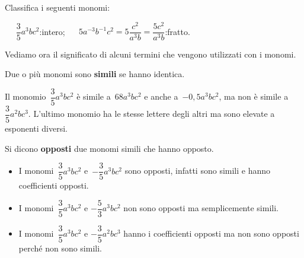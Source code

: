 
\begin{esempio}{}{}
Classifica i seguenti monomi:

\hfill {}~~ \(\dfrac{3}{5}a^{3}bc^{2}\):\quad intero; 
\hfill
{}~~ \(5a^{-3}b^{-1}c^{2}=
             5 \dfrac{c^{2}}{a^{3}b} =
             \dfrac{5c^{2}}{a^{3}b}\):\quad fratto. \hfill~
\end{esempio}

Vediamo ora il significato di alcuni termini che vengono utilizzati con i 
monomi.

\begin{definizione}{}{}
Due o più monomi sono \textbf{simili} se
hanno  identica.
\end{definizione}

\begin{esempio}{}{}
Il monomio~\(\dfrac{3}{5}a^{3}bc^{2}\) è simile
a~\(68a^{3}bc^{2}\) e anche a~\(-0,5a^{3}bc^{2}\), ma non è simile
a~\(\dfrac{3}{5}a^{2}bc^{3}\). 
L'ultimo monomio ha le stesse lettere degli altri ma sono elevate a 
esponenti diversi.
\end{esempio}

\begin{definizione}{}{}
Si dicono \textbf{opposti} due monomi
simili che hanno  opposto.
\end{definizione}

\begin{esempio}{}{}
\begin{itemize} [nosep]
\item
I monomi~\(\dfrac{3}{5}a^{3}bc^{2}\) e~\(-{\dfrac{3}{5}}a^{3}bc^{2}\) 
sono opposti, infatti sono simili e hanno coefficienti opposti.
\item
I monomi~\(\dfrac{3}{5}a^{3}bc^{2}\) e \(-\dfrac{5}{3}a^{3}bc^{2}\) 
non sono opposti ma semplicemente simili. 
\item
I monomi~\(\dfrac{3}{5}a^{3}bc^{2}\) e \(-\dfrac{3}{5}a^{2}bc^{3}\) 
hanno i coefficienti opposti ma non sono opposti perché non sono 
simili. 
\end{itemize}
\end{esempio}

